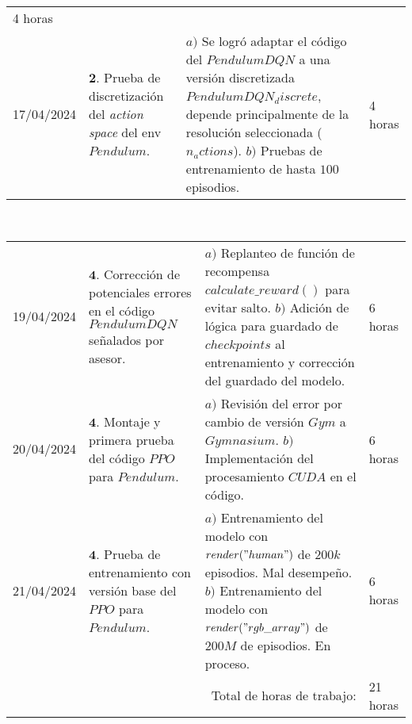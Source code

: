 \documentclass[12pt]{article}
\begin{document}
\begin{minipage}[h]{\textwidth}
\begin{tabularx}{\textwidth}{|p{2cm}|X|X|p{2cm}|}
	 	4 horas \\
		17/04/2024 & 
	 	$\mathbf{2}.$ Prueba de discretización del \textit{action space} del env $Pendulum$. &
	 	$a)$ Se logró adaptar el código del $PendulumDQN$ a una versión discretizada $PendulumDQN_discrete$, depende principalmente de la resolución seleccionada ($n_actions$). \newline
	 	$b)$ Pruebas de entrenamiento de hasta $100$ episodios. \newline & 
	 	4 horas \\
	 	\hline
	\end{tabularx}
\end{minipage}	 	
	 	
\hfill\\
\begin{minipage}[h]{\textwidth}
	\centering
	\begin{tabularx}{\textwidth}{|p{2cm}|X|X|p{2cm}|} 
		\hline		
		
	 	19/04/2024 & 
	 	$\mathbf{4}.$ Corrección de potenciales errores en el código $PendulumDQN$ señalados por asesor. &
	 	$a)$ Replanteo de función de recompensa $calculate\_ reward()$ para evitar salto. \newline
	 	$b)$ Adición de lógica para guardado de $checkpoints$ al entrenamiento y corrección del guardado del modelo. \newline & 
	 	6 horas \\
	 	20/04/2024 & 
	 	$\mathbf{4}.$ Montaje y primera prueba del código \href{https://github.com/ericyangyu/PPO-for-Beginners/tree/master}{$PPO$} para $Pendulum$. &
	 	$a)$ Revisión del error por cambio de versión $Gym$ a $Gymnasium$. \newline
	 	$b)$ Implementación del procesamiento $CUDA$ en el código. \newline & 
	 	6 horas \\
	 	21/04/2024 & 
	 	$\mathbf{4}.$ Prueba de entrenamiento con versión base del $PPO$ para $Pendulum$. &
	 	$a)$ Entrenamiento del modelo con $render("human")$ de $200k$ episodios. Mal desempeño. \newline
	 	$b)$ Entrenamiento del modelo con $render("rgb\_ array")$ de $200M$ de episodios. En proceso. \newline & 
	 	6 horas \\
	 	
	 	\hline
		\multicolumn{3}{|r|}{Total de horas de trabajo:} & 21 horas \\ 
	 	\hline                 
	\end{tabularx}
\end{minipage}
\end{document}
